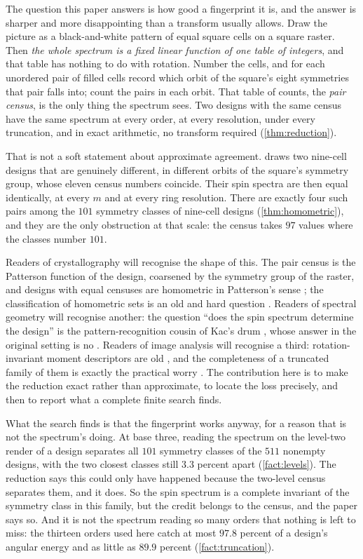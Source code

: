 \documentclass[11pt]{amsart}
\theoremstyle{definition}
\theoremstyle{remark}
\begin{document}
The question this paper answers is how good a fingerprint it is, and the answer is sharper and more disappointing than a transform usually allows. Draw the picture as a black-and-white pattern of equal square cells on a square raster. Then \emph{the whole spectrum is a fixed linear function of one table of integers}, and that table has nothing to do with rotation. Number the cells, and for each unordered pair of filled cells record which orbit of the square's eight symmetries that pair falls into; count the pairs in each orbit. That table of counts, the \emph{pair census}, is the only thing the spectrum sees. Two designs with the same census have the same spectrum at every order, at every resolution, under every truncation, and in exact arithmetic, no transform required (\cref{thm:reduction}).

That is not a soft statement about approximate agreement.  draws two nine-cell designs that are genuinely different, in different orbits of the square's symmetry group, whose eleven census numbers coincide. Their spin spectra are then equal identically, at every $m$ and at every ring resolution. There are exactly four such pairs among the $101$ symmetry classes of nine-cell designs (\cref{thm:homometric}), and they are the only obstruction at that scale: the census takes $97$ values where the classes number $101$.

Readers of crystallography will recognise the shape of this. The pair census is the Patterson function of the design, coarsened by the symmetry group of the raster, and designs with equal censuses are homometric in Patterson's sense \cite{patterson}; the classification of homometric sets is an old and hard question \cite{rosenblatt}. Readers of spectral geometry will recognise another: the question ``does the spin spectrum determine the design'' is the pattern-recognition cousin of Kac's drum \cite{kac}, whose answer in the original setting is no \cite{gordonwebbwolpert}. Readers of image analysis will recognise a third: rotation-invariant moment descriptors are old \cite{hu}, and the completeness of a truncated family of them is exactly the practical worry \cite{teague}. The contribution here is to make the reduction exact rather than approximate, to locate the loss precisely, and then to report what a complete finite search finds.

What the search finds is that the fingerprint works anyway, for a reason that is not the spectrum's doing. At base three, reading the spectrum on the level-two render of a design separates all $101$ symmetry classes of the $511$ nonempty designs, with the two closest classes still $3.3$ percent apart (\cref{fact:levels}). The reduction says this could only have happened because the two-level census separates them, and it does. So the spin spectrum is a complete invariant of the symmetry class in this family, but the credit belongs to the census, and the paper says so. And it is not the spectrum reading so many orders that nothing is left to miss: the thirteen orders used here catch at most $97.8$ percent of a design's angular energy and as little as $89.9$ percent (\cref{fact:truncation}).
\end{document}
